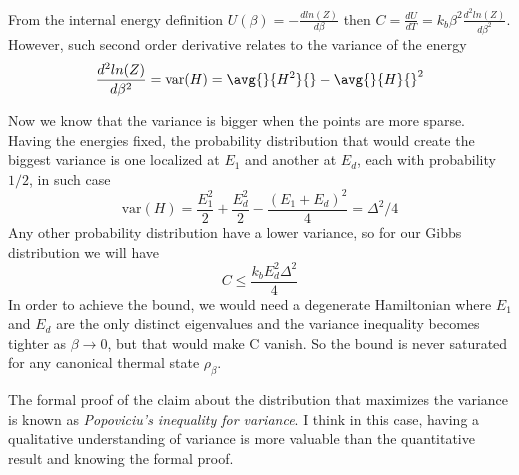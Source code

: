 \begin{solution}
From the internal energy definition
$U(\beta)= - \frac{ d ln(Z)}{d\beta}$
then
$C= \frac{dU}{dT}= k_b\beta^2 \frac{d^2 ln(Z)}{d\beta^2}.$
However, such second order derivative relates to the variance of the energy 
$$\frac{d^2 ln(Z)}{d\beta^2} = \text{var}(H)= \avg{}{H^2}{} - \avg{}{H}{}^2 $$

Now we know that the variance is bigger when the points are more sparse. Having the energies fixed, the probability distribution that would create the biggest variance is one localized at $E_1$ and another at $E_d$, each with probability $1/2$, in such case 
$$\text{var}(H) = \frac{E_1^2}{2} + \frac{E_d^2}{2} - \frac{(E_1 + E_d)^2}{4} = \Delta^2/4$$
Any other probability distribution have a lower variance, so for our Gibbs distribution we will have
$$C \leq \frac{k_b E_d^2\Delta^2}{4}$$
In order to achieve the bound, we would need a degenerate Hamiltonian where $E_1$ and $E_d$ are the only distinct eigenvalues and the variance inequality becomes tighter as $\beta \rightarrow 0$, but that would make C vanish. So the bound is never saturated for any canonical thermal state $\rho_\beta$.
\end{solution}

\begin{takeaway}
The formal proof of the claim about the distribution that maximizes the variance is known as \emph{Popoviciu's inequality for variance}. I think in this case, having a qualitative understanding of variance is more valuable than the quantitative result and knowing the formal proof.
\end{takeaway}

\begin{attemptlog}
  \item[Date] \todo{}
  \item[Time taken] \todo{}
  \item[Unaided?] \todo{}
  \item[Hints used] \todo{}
  \item[Difficulty] 
  \item[Error type] 
\end{attemptlog}